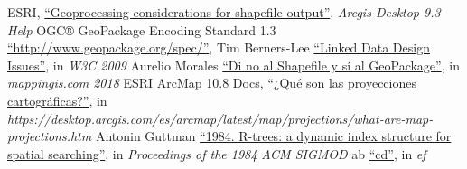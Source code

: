 \begin{thebibliography}{99}
     ESRI, 
        \href{http://webhelp.esri.com/arcgisdesktop/9.3/index.cfm?TopicName=Geoprocessing\%20considerations\%20for\%20shapefile\%20output}{``Geoprocessing considerations for shapefile output''},
        \textit{Arcgis Desktop 9.3 Help}
    OGC® GeoPackage Encoding Standard 1.3
        \href{http://www.geopackage.org/spec/}{``http://www.geopackage.org/spec/''},
     Tim Berners-Lee 
        \href{https://www.w3.org/DesignIssues/LinkedData.html}{``Linked Data Design Issues''},
        in \textit{W3C 2009}
     Aurelio Morales
        \href{https://mappinggis.com/2018/08/di-no-al-shapefile-y-si-al-geopackage/}{``Di no al Shapefile y sí al GeoPackage''},
        in \textit{mappingis.com 2018}
     ESRI ArcMap 10.8 Docs,
        \href{https://desktop.arcgis.com/es/arcmap/latest/map/projections/what-are-map-projections.htm}{``¿Qué son las proyecciones cartográficas?''},
        in \textit{https://desktop.arcgis.com/es/arcmap/latest/map/projections/what-are-map-projections.htm}
     Antonin Guttman
        \href{https://dl.acm.org/doi/10.1145/602259.602266}{``1984. R-trees: a dynamic index structure for spatial searching''},
        in \textit{Proceedings of the 1984 ACM SIGMOD }
    ab
        \href{}{``cd''},
        in \textit{ef}



\end{thebibliography}

